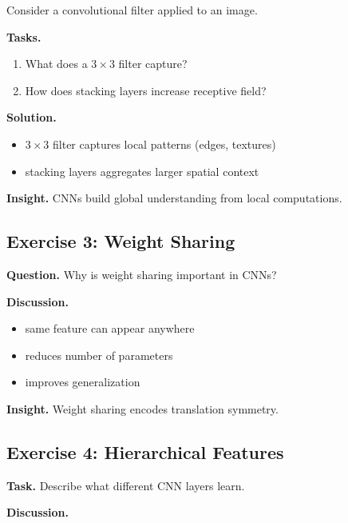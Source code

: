 Consider a convolutional filter applied to an image.

\medskip

\noindent
\textbf{Tasks.}
\begin{enumerate}
    \item What does a $3 \times 3$ filter capture?
    \item How does stacking layers increase receptive field?
\end{enumerate}

\medskip

\noindent
\textbf{Solution.}

\begin{itemize}
    \item $3 \times 3$ filter captures local patterns (edges, textures)
    \item stacking layers aggregates larger spatial context
\end{itemize}

\medskip

\noindent
\textbf{Insight.}  
CNNs build global understanding from local computations.

\subsection{Exercise 3: Weight Sharing}

\textbf{Question.}  
Why is weight sharing important in CNNs?

\medskip

\noindent
\textbf{Discussion.}

\begin{itemize}
    \item same feature can appear anywhere
    \item reduces number of parameters
    \item improves generalization
\end{itemize}

\medskip

\noindent
\textbf{Insight.}  
Weight sharing encodes translation symmetry.

\subsection{Exercise 4: Hierarchical Features}

\textbf{Task.}  
Describe what different CNN layers learn.

\medskip

\noindent
\textbf{Discussion.}

